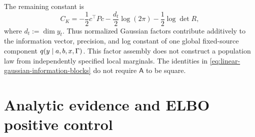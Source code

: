 The remaining constant is
\begin{equation}
C_K
=-\frac12c^\top P c
-\frac{d_t}{2}\log(2\pi)
-\frac12\log\det R,
\label{eq:linear-gaussian-factor-constant}
\end{equation}
where $d_t:=\dim y_t$. Thus normalized Gaussian factors contribute additively to the information vector, precision, and log constant of one global fixed-source component $q(y\mid a,b,x,\Gamma)$. This factor assembly does not construct a population law from independently specified local marginals. The identities in \cref{eq:linear-gaussian-information-blocks} do not require $\mathsf A$ to be square.

\section{Analytic evidence and ELBO positive control}


